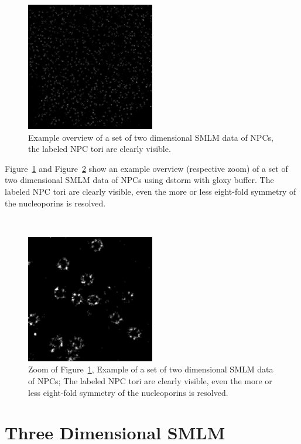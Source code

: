 \documentclass[11pt, a4paper, oneside, twocolumn]{report}
\newcommand{\x}[1]{#1\index{#1}}
\begin{document}
\begin{figure}[h]
  \centering
  \includegraphics[width=0.5\textwidth]{npc/npc2048.png}
  \caption{Example overview of a set of two dimensional SMLM data of
    NPCs, the labeled NPC tori are clearly visible.}
  \label{f:npco}
\end{figure}

Figure~\ref{f:npco} and Figure~\ref{f:npcz} show an example overview
(respective zoom) of a set of two dimensional SMLM data of NPCs using
\gls{dstorm} with \gls{gloxy} buffer. The labeled NPC tori are clearly
visible, even the more or less eight-fold symmetry of the
\x{nucleoporin}s is resolved.

\newpage
~ %
\begin{figure}[t!]
  \centering
  \includegraphics[width=0.5\textwidth]{npc/npc256.png}
  \caption{Zoom of Figure~\ref{f:npco}, Example of a set of two
    dimensional SMLM data of NPCs; The labeled NPC tori are clearly
    visible, even the more or less eight-fold symmetry of the
    nucleoporins is resolved.}
  \label{f:npcz}
\end{figure}


\clearpage\section{Three Dimensional SMLM}\label{s:r:ana}
\end{document}
